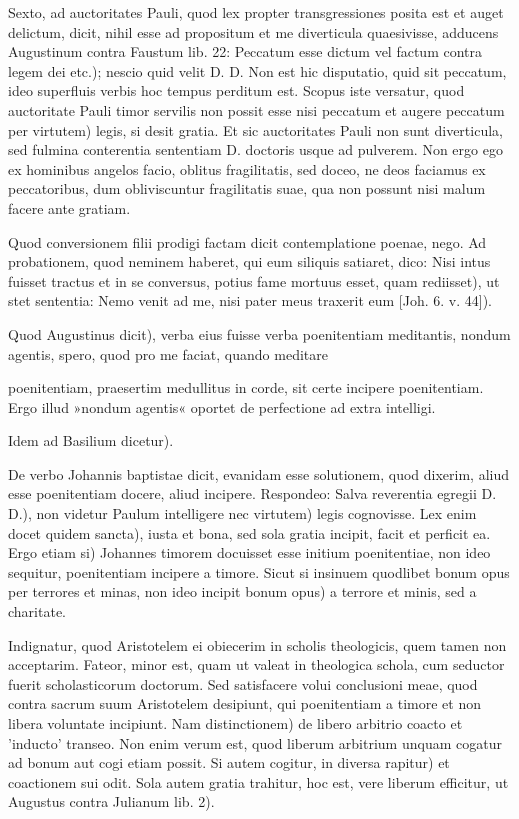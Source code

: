 Sexto, ad auctoritates Pauli, quod lex propter transgressiones posita est et auget delictum, dicit, nihil esse ad propositum et me diverticula quaesivisse, adducens Augustinum contra Faustum lib. 22: Peccatum esse dictum vel factum contra legem dei etc.); nescio quid velit D. D. Non est hic disputatio, quid sit peccatum, ideo superfluis verbis hoc tempus perditum est. Scopus iste versatur, quod auctoritate Pauli timor servilis non possit esse nisi peccatum et augere peccatum per virtutem) legis, si desit gratia. Et sic auctoritates Pauli non sunt diverticula, sed fulmina conterentia sententiam D. doctoris usque ad pulverem. Non ergo ego ex hominibus angelos facio, oblitus fragilitatis, sed doceo, ne deos faciamus ex peccatoribus, dum obliviscuntur fragilitatis suae, qua non possunt nisi malum facere ante gratiam.

Quod conversionem filii prodigi factam dicit contemplatione poenae, nego. Ad probationem, quod neminem haberet, qui eum siliquis satiaret, dico: Nisi intus fuisset tractus et in se conversus, potius fame mortuus esset, quam rediisset), ut stet sententia: Nemo venit ad me, nisi pater meus traxerit eum [Joh. 6. v. 44]).

Quod Augustinus dicit), verba eius fuisse verba poenitentiam meditantis, nondum agentis, spero, quod pro me faciat, quando meditare

poenitentiam, praesertim medullitus in corde, sit certe incipere poenitentiam. Ergo illud »nondum agentis« oportet de perfectione ad extra intelligi.

Idem ad Basilium dicetur).

De verbo Johannis baptistae dicit, evanidam esse solutionem, quod dixerim, aliud esse poenitentiam docere, aliud incipere. Respondeo: Salva \marginpar{\small[370]} reverentia egregii D. D.), non videtur Paulum intelligere nec virtutem) legis cognovisse. Lex enim docet quidem sancta), iusta et bona, sed sola gratia incipit, facit et perficit ea. Ergo etiam si) Johannes timorem docuisset esse initium poenitentiae, non ideo sequitur, poenitentiam incipere a timore. Sicut si insinuem quodlibet bonum opus per terrores et minas, non ideo incipit bonum opus) a terrore et minis, sed a charitate.

Indignatur, quod Aristotelem ei obiecerim in scholis theologicis, quem tamen non acceptarim. Fateor, minor est, quam ut valeat in theologica schola, cum seductor fuerit scholasticorum doctorum. Sed satisfacere volui conclusioni meae, quod contra sacrum suum Aristotelem desipiunt, qui poenitentiam a timore et non libera voluntate incipiunt. Nam distinctionem) de libero arbitrio coacto et 'inducto' transeo. Non enim verum est, quod liberum arbitrium unquam cogatur ad bonum aut cogi etiam possit. Si autem cogitur, in diversa rapitur) et coactionem sui odit. Sola autem gratia trahitur, hoc est, vere liberum efficitur, ut Augustus contra Julianum lib. 2).

